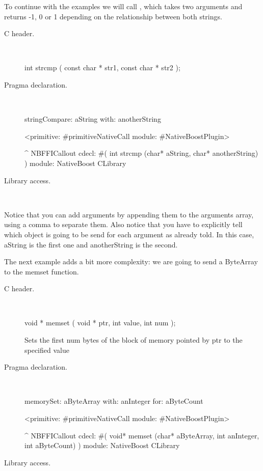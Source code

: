 \documentclass[a4paper,10pt,twoside]{book}
\begin{document}
To continue with the examples we will call , which takes two arguments and returns -1, 0 or 1 depending on the relationship between both strings.

\begin{description}
\item [C header.] \ 

\begin{code}{}
int strcmp ( const char * str1, const char * str2 );
\end{code}

\item [Pragma declaration.] \ 

\begin{code}{}
stringCompare: aString with: anotherString

	<primitive: #primitiveNativeCall module: #NativeBoostPlugin>
	
	^ NBFFICallout cdecl: #( int strcmp (char* aString, char* anotherString) ) module: NativeBoost CLibrary
\end{code}


\item [Library access.] \ 
 

\end{description}

Notice that you can add arguments by appending them to the arguments array,
using a comma to separate them. Also notice that you have to explicitly tell
which object is going to be send for each argument as already told. In this case, aString is
the first one and anotherString is the second.

The next example adds a bit more complexity: we are going to send a ByteArray
to the memset function. 

\begin{description}
\item [C header.] \ 

\begin{code}{}
void * memset ( void * ptr, int value, int num );
\end{code}
Sets the first num bytes of the block of memory pointed by ptr to the specified value

\item [Pragma declaration.] \ 

\begin{code}{}
memorySet: aByteArray with: anInteger for: aByteCount

	<primitive: #primitiveNativeCall module: #NativeBoostPlugin>
	
	^ NBFFICallout cdecl: #( void* memset (char* aByteArray, int anInteger, int aByteCount) ) module: NativeBoost CLibrary
\end{code}


\item [Library access.] \ 
 

\end{description}
\end{document}
